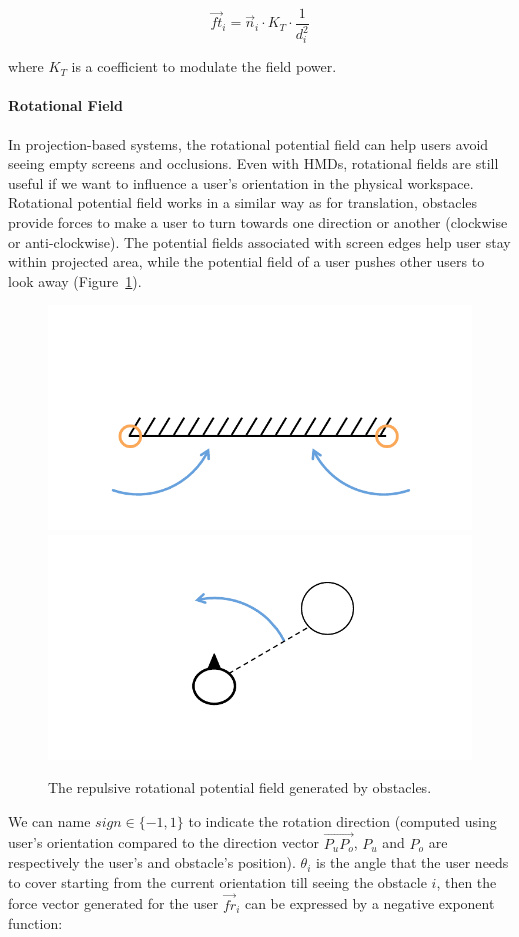 \begin{equation}
\overrightarrow{ft}_{i}=\overrightarrow{n}_{i} \cdot K_{T} \cdot \frac{1}{d_{i}^2}
\end{equation}

where $K_{T}$ is a coefficient to modulate the field power.

\paragraph{Rotational Field}
In projection-based systems, the rotational potential field can help users avoid seeing empty screens and occlusions. Even with HMDs, rotational fields are still useful if we want to influence a user's orientation in the physical workspace. Rotational potential field works in a similar way as for translation, obstacles provide forces to make a user to turn towards one direction or another (clockwise or anti-clockwise). The potential fields associated with screen edges help user stay within projected area, while the potential field of a user pushes other users to look away (Figure~\ref{fig:5_pf_r}).

\begin{figure}[htb]
  \centering
  \includegraphics[width=.49\textwidth]{figures/ch5/pf_r_wall}
  \includegraphics[width=.49\textwidth]{figures/ch5/pf_r_user}
  \caption{\label{fig:5_pf_r}The repulsive rotational potential field generated by obstacles.}
\end{figure}

We can name $sign \in \{-1, 1\}$ to indicate the rotation direction (computed using user's orientation compared to the direction vector $\overrightarrow{P_{u}P_{o}}$, $P_{u}$ and $P_{o}$ are respectively the user's and obstacle's position). $\theta_{i}$ is the angle that the user needs to cover starting from the current orientation till seeing the obstacle $i$, then the force vector generated for the user $\overrightarrow{fr}_{i}$ can be expressed by a negative exponent function:

